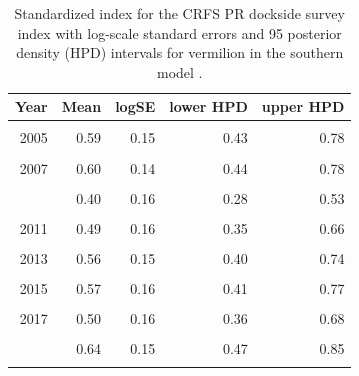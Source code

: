 \documentclass[11pt,
  english,
  a4paper,
]{article}
\begin{document}
\begin{table}

\caption{\label{tab:tab-index-crfspr}Standardized index for the CRFS PR dockside survey index with log-scale standard errors and 95%
       posterior density (HPD) intervals for vermilion in the southern model .}
\centering
\begin{tabular}[t]{rrrrr}
\toprule
Year & Mean & logSE & lower HPD & upper HPD\\
\midrule
\cellcolor{gray!6}{2004} & \cellcolor{gray!6}{0.99} & \cellcolor{gray!6}{0.14} & \cellcolor{gray!6}{0.74} & \cellcolor{gray!6}{1.27}\\
2005 & 0.59 & 0.15 & 0.43 & 0.78\\
\cellcolor{gray!6}{2006} & \cellcolor{gray!6}{0.55} & \cellcolor{gray!6}{0.15} & \cellcolor{gray!6}{0.41} & \cellcolor{gray!6}{0.74}\\
2007 & 0.60 & 0.14 & 0.44 & 0.78\\
\cellcolor{gray!6}{2008} & \cellcolor{gray!6}{0.46} & \cellcolor{gray!6}{0.15} & \cellcolor{gray!6}{0.34} & \cellcolor{gray!6}{0.61}\\
\addlinespace
2009 & 0.40 & 0.16 & 0.28 & 0.53\\
\cellcolor{gray!6}{2010} & \cellcolor{gray!6}{0.41} & \cellcolor{gray!6}{0.16} & \cellcolor{gray!6}{0.29} & \cellcolor{gray!6}{0.56}\\
2011 & 0.49 & 0.16 & 0.35 & 0.66\\
\cellcolor{gray!6}{2012} & \cellcolor{gray!6}{0.47} & \cellcolor{gray!6}{0.17} & \cellcolor{gray!6}{0.33} & \cellcolor{gray!6}{0.64}\\
2013 & 0.56 & 0.15 & 0.40 & 0.74\\
\addlinespace
\cellcolor{gray!6}{2014} & \cellcolor{gray!6}{0.59} & \cellcolor{gray!6}{0.15} & \cellcolor{gray!6}{0.43} & \cellcolor{gray!6}{0.79}\\
2015 & 0.57 & 0.16 & 0.41 & 0.77\\
\cellcolor{gray!6}{2016} & \cellcolor{gray!6}{0.50} & \cellcolor{gray!6}{0.16} & \cellcolor{gray!6}{0.35} & \cellcolor{gray!6}{0.67}\\
2017 & 0.50 & 0.16 & 0.36 & 0.68\\
\cellcolor{gray!6}{2018} & \cellcolor{gray!6}{0.44} & \cellcolor{gray!6}{0.17} & \cellcolor{gray!6}{0.31} & \cellcolor{gray!6}{0.60}\\
\addlinespace
2019 & 0.64 & 0.15 & 0.47 & 0.85\\
\cellcolor{gray!6}{2020} & \cellcolor{gray!6}{0.51} & \cellcolor{gray!6}{0.24} & \cellcolor{gray!6}{0.31} & \cellcolor{gray!6}{0.78}\\
\bottomrule
\end{tabular}
\end{table}
\end{document}
